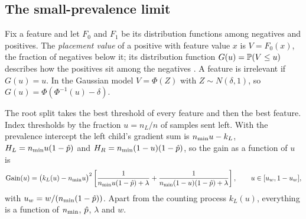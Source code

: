 \subsection{The small-prevalence limit}\label{sec:limit}

Fix a feature and let $F_0$ and $F_1$ be its distribution functions among negatives and positives. The \emph{placement value} of a positive with feature value $x$ is $V = F_0(x)$, the fraction of negatives below it; its distribution function $G(u) = \P(V \le u)$ describes how the positives sit among the negatives \citep{hanley1982meaning,pepe2004placement}. A feature is irrelevant if $G(u) = u$. In the Gaussian model $V = \Phi(Z)$ with $Z \sim N(\delta,1)$, so $G(u) = \Phi(\Phi^{-1}(u) - \delta)$.

The root split takes the best threshold of every feature and then the best feature. Index thresholds by the fraction $u = n_L/n$ of samples sent left. With the prevalence intercept the left child's gradient sum is $\nmin u - k_L$, $H_L = \nmin u(1-\phat)$ and $H_R = \nmin(1-u)(1-\phat)$, so the gain as a function of $u$ is
\begin{equation}\label{eq:process}
  \Gain(u) = \bigl(k_L(u) - \nmin u\bigr)^2\left[\frac{1}{\nmin u(1-\phat)+\lambda} + \frac{1}{\nmin(1-u)(1-\phat)+\lambda}\right],\qquad u \in [u_w, 1-u_w],
\end{equation}
with $u_w = w/(\nmin(1-\phat))$. Apart from the counting process $k_L(u)$, everything is a function of $\nmin$, $\phat$, $\lambda$ and $w$.

